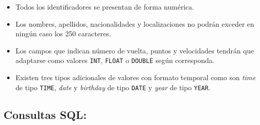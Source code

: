 \documentclass{db-practice}
\begin{document}
\begin{itemize}
    \item Todos los identificadores se presentan de forma numérica.
    \item Los nombres, apellidos, nacionalidades y localizaciones no podrán exceder en ningún caso los 250 caracteres.
    \item Los campos que indican número de vuelta, puntos y velocidades tendrán que adaptarse como valores \texttt{INT}, \texttt{FLOAT} o \texttt{DOUBLE} según corresponda.
    \item Existen tres tipos adicionales de valores con formato temporal como son \textit{time} de tipo \texttt{TIME}, \textit{date} y \textit{birthday} de tipo \texttt{DATE} y \textit{year} de tipo \texttt{YEAR}.
\end{itemize}

\subsection{Consultas SQL:}
\end{document}
